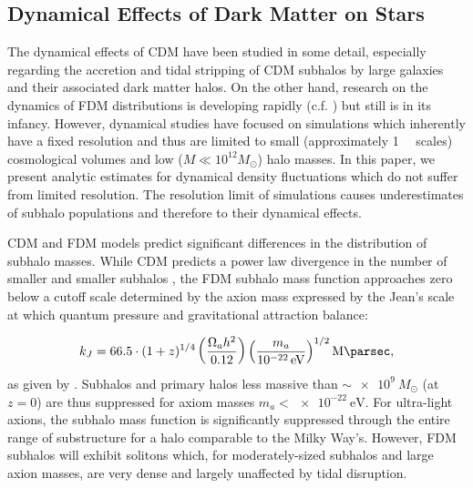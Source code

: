 \documentclass[usenatbib]{mnras}
\newcommand{\poweV}[1]{\SI{e#1}{\electronvolt}}
\begin{document}
\subsection{Dynamical Effects of Dark Matter on Stars}

The dynamical effects of CDM have been studied in some detail, especially regarding the accretion and tidal stripping of CDM subhalos by large galaxies and their associated dark matter halos. On the other hand, research on the dynamics of FDM distributions is developing rapidly (c.f. \cite{schive_solitons, Schrodinger-Poisson, Schive-virialized-wave-halos, relaxation}) but still is in its infancy. However, dynamical studies have focused on simulations which inherently have a fixed resolution and thus are limited to small (approximately \SI{1}{\mega \parsec} scales) cosmological volumes and low ($M \ll 10^{12} M_{\odot}$) halo masses. In this paper, we present analytic estimates for dynamical density fluctuations which do not suffer from limited resolution. The resolution limit of simulations causes underestimates of subhalo populations and therefore to their dynamical effects. 

\par 
	CDM and FDM models predict significant differences in the distribution of {\color{magenta} subhalo masses}. While CDM predicts a power law divergence in the number { \color{magenta} of smaller and smaller} subhalos \citep{power_spectra_JPO}, the FDM subhalo mass function approaches zero below a cutoff scale determined by the axion mass expressed by the Jean’s scale at which quantum pressure and gravitational attraction balance:
\setlength{\belowdisplayskip}{4pt} \setlength{\belowdisplayshortskip}{4pt}
\setlength{\abovedisplayskip}{4pt} \setlength{\abovedisplayshortskip}{4pt}

\begin{equation}
k_J = 66.5 \cdot (1+z)^{1/4} \left( \frac{\Omega_a h^2}{0.12} \right) \left(\frac{m_a}{\poweV{-22}} \right)^{1/2} \si{\per\mega\parsec},
\end{equation}
\noindent
as given by \citet{axion_cosmology}. Subhalos and primary halos less massive than $\sim \SI{e9}{M_{\odot}}$ (at $z = 0$) are thus suppressed for axiom masses $m_a < \SI{e-22}{\electronvolt}$. For ultra-light axions, the subhalo mass function is significantly suppressed {\color{red} through} the entire range of substructure for a halo comparable to the Milky Way’s. However, FDM subhalos will exhibit solitons which, for moderately-sized subhalos and large axion masses, are very dense and largely unaffected by tidal disruption. 
\end{document}
